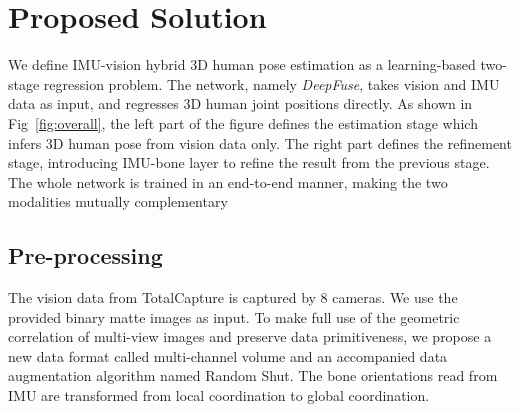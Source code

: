 \documentclass[10pt,twocolumn,letterpaper]{article}
\begin{document}
\vspace{-0.2cm}
\section{Proposed Solution}
\label{sec:method}
We define IMU-vision hybrid 3D human pose estimation as a learning-based two-stage regression problem. The network, namely \emph{DeepFuse}, takes vision and IMU data as input, and regresses 3D human joint positions directly. As shown in Fig~\ref{fig:overall}, the left part of the figure defines the estimation stage which infers 3D human pose from vision data only. The right part defines the refinement stage, introducing IMU-bone layer to refine the result from the previous stage. The whole network is trained in an end-to-end manner, making the two modalities mutually complementary
\vspace{-0.2cm}
\subsection{Pre-processing}
The vision data from TotalCapture\cite{Trumble:BMVC:2017} is captured by 8 cameras. We use the provided binary matte images as input. To make full use of the geometric correlation of multi-view images and preserve data primitiveness, we propose a new data format called multi-channel volume and an accompanied data augmentation algorithm named Random Shut. The bone orientations read from IMU are transformed from local coordination to global coordination.
\end{document}
